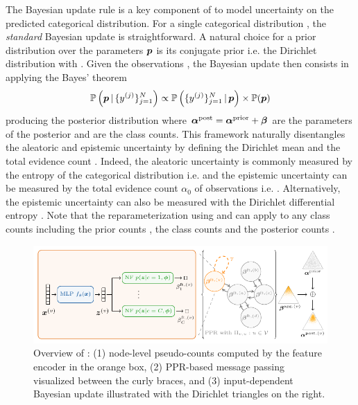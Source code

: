 The Bayesian update rule is a key component of \oursacro{} to model uncertainty on the predicted categorical distribution. For a single categorical distribution \smash{$\y \sim \DCat(\p)$}, the \emph{standard} Bayesian update is straightforward. A natural choice for a prior distribution over the parameters $\bm{p}$ is its conjugate prior i.e. the Dirichlet distribution  with . Given the observations , the Bayesian update then consists in applying the Bayes' theorem 
\begin{align}
    \operatorname{\mathbb{P}}\left( \bm{p} \,|\, \{ y
^{(j)}\}_{j=1}^N \right) \propto \operatorname{\mathbb{P}}\left(\{ y^{(j)}  \}_{j=1}^N \,|\, \bm{p} \right) \times \operatorname{\mathbb{P}}(\bm{p})
\end{align} producing the posterior distribution  where $\bm{\alpha}^\text{post} = \bm{\alpha}^\text{prior} + \bm{\beta}$ are the parameters of the posterior and  are the class counts. This framework naturally disentangles the aleatoric and epistemic uncertainty by defining the Dirichlet mean  and the total evidence count . Indeed, the aleatoric uncertainty is commonly measured by the entropy of the categorical distribution i.e.  \cite{Malinin2017, charpentier2020, NatPN2021} and the epistemic uncertainty can be measured by the total evidence count $\alpha_0$ of observations i.e.  \cite{charpentier2020, NatPN2021}. Alternatively, the epistemic uncertainty can also be measured with the Dirichlet differential entropy \cite{Malinin2017}. Note that the reparameterization using \smash{$\bar{\p}$} and  can apply to any class counts including the prior counts , the class counts \smash{$\vbeta$} and the posterior counts .

\begin{figure}
    \centering
	\includegraphics[width=.75\textwidth]{sections/009_neurips2021/resources/model.pdf}
	\caption{Overview of \ours{}: (1) node-level pseudo-counts computed by the feature encoder in the orange box, (2) PPR-based message passing visualized between the curly braces, and (3) input-dependent Bayesian update illustrated with the Dirichlet triangles on the right.}
    \label{fig:model_vis}
    \vspace{-3mm}
\end{figure}

